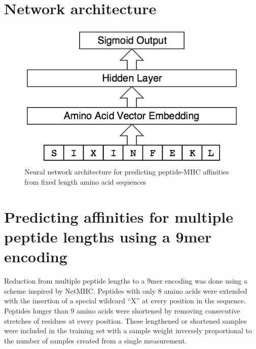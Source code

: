 
\section{Network architecture}

\begin{figure}[h]
\centering
\includegraphics[scale=0.5]{figures/mhcflurry-gliffy-network.png}
\caption{Neural network architecture for predicting peptide-MHC affinities from fixed length amino acid sequences}
\end{figure}

\section{Predicting affinities for multiple peptide lengths using a 9mer encoding}
Reduction from multiple peptide lengths to a 9mer encoding was done using a scheme inspired by NetMHC\cite{lundegaard2008accurate}. Peptides with only 8 amino acids were extended with the insertion of a special wildcard ``X'' at every position in the sequence. Peptides longer than 9 amino acids were shortened by removing consecutive stretches of residues at every position. These lengthened or shortened samples were included in the training set with a sample weight inversely proportional to the number of samples created from a single measurement. 